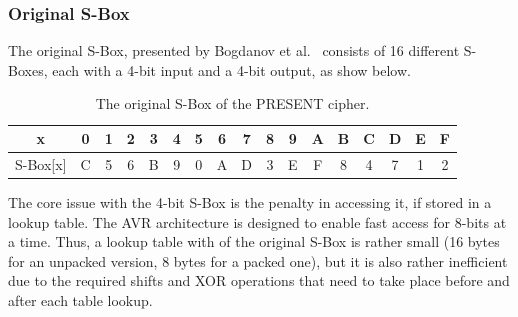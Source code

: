 \documentclass{llncs}
\begin{document}
\subsubsection{Original S-Box}\label{osbox}
The original S-Box, presented by Bogdanov et al.~\cite{bogdanov2007present} consists of 16 different S-Boxes, each with a 4-bit input and a 4-bit output, as show below.\\
\begin{table}[h]
\centering
\begin{tabular}{| c | c  | c | c | c  | c | c | c  | c | c | c  | c | c | c  | c | c | c |}
\hline
  x & 0 & 1 & 2 & 3 & 4 & 5 & 6 & 7 & 8 & 9 & A & B & C & D & E & F   \\
\hline
  S-Box[x] & C & 5 & 6 & B & 9 & 0 & A & D & 3 & E & F & 8 & 4 & 7 & 1 & 2   \\
\hline
\end{tabular}
 \caption{\small The original S-Box of the PRESENT cipher.}
\end{table}


The core issue with the 4-bit S-Box is the penalty in accessing it, if stored in a lookup table. The AVR architecture is designed to enable fast access for 8-bits at a time. Thus, a lookup table with of the original S-Box is rather small (16 bytes for an unpacked version, 8 bytes for a packed one), but it is also rather inefficient due to the required shifts and XOR operations that need to take place before and after each table lookup.
\end{document}
